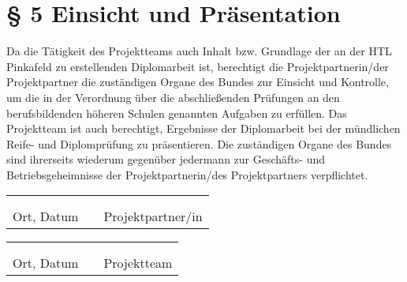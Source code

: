 \section*{§ 5 Einsicht und Präsentation}
Da die Tätigkeit des Projektteams auch Inhalt bzw. Grundlage der an der HTL Pinkafeld zu erstellenden Diplomarbeit ist, berechtigt die Projektpartnerin/der Projektpartner die zuständigen Organe des Bundes zur Einsicht und Kontrolle, um die in der Verordnung über die abschließenden Prüfungen an den berufsbildenden höheren Schulen genannten Aufgaben zu erfüllen. Das Projektteam ist auch berechtigt, Ergebnisse der Diplomarbeit bei der mündlichen Reife- und Diplomprüfung zu präsentieren. Die zuständigen Organe des Bundes sind ihrerseits wiederum gegenüber jedermann zur Geschäfts- und Betriebsgeheimnisse der Projektpartnerin/des Projektpartners verpflichtet. 

\vspace*{1cm}

\begin{tabular}{cp{2em}c} 
   \hspace{4cm}        & & \hspace{6cm} \\\cline{1-1}\cline{3-3}
                       & & \\[-3mm]
   {\footnotesize Ort, Datum }  & & {\footnotesize Projektpartner/in }
\end{tabular}

\vspace*{1cm}

\begin{tabular}{cp{2em}c} 
   \hspace{4cm}        & & \hspace{6cm} \\\cline{1-1}\cline{3-3}
                       & & \\[-3mm]
   {\footnotesize Ort, Datum }  & & {\footnotesize Projektteam }
\end{tabular}